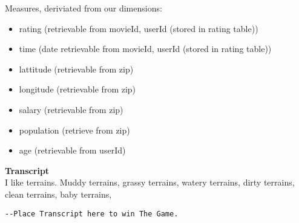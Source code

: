 \noindent Measures, deriviated from our dimensions:

\begin{itemize}
  \item rating (retrievable from movieId, userId (stored in rating table))
  \item time (date retrievable from movieId, userId (stored in rating table))
  \item lattitude (retrievable from zip)
  \item longitude (retrievable from zip)
  \item salary (retrievable from zip)
  \item population (retrieve from zip)
  \item age (retrievable from userId)
\end{itemize}

\textbf{Transcript} \\
I like terrains.
Muddy terrains, grassy terrains, watery terrains, dirty terrains, clean terrains, baby terrains,
\begin{lstlisting}
--Place Transcript here to win The Game.
\end{lstlisting}